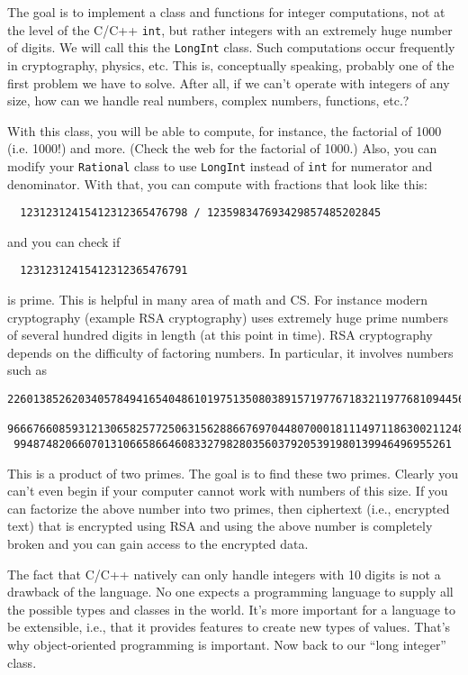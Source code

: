 The goal is to implement a class and functions for integer computations, not at
the level of the C/C++ \verb!int!, but rather integers with an extremely huge
number of digits. We will call this the \verb!LongInt! class.  Such
computations occur frequently in cryptography, physics, etc. This is,
conceptually speaking, probably one of the first problem we have to solve.
After all, if we can't operate with integers of any size, how can we handle
real numbers, complex numbers, functions, etc.?

With this class, you will be able to compute, for instance, the factorial of
1000 (i.e. 1000!) and more.  (Check the web for the factorial of 1000.) Also,
you can modify your \verb!Rational! class to use \verb!LongInt! instead of
\verb!int!  for numerator and denominator. With that, you can compute with
fractions that look like this:

\verb!  12312312415412312365476798 / 123598347693429857485202845!

and you can check if

\verb!  12312312415412312365476791!

is prime.  This is helpful in many area of math and CS. For instance modern
cryptography (example RSA cryptography) uses extremely huge prime numbers of
several hundred digits in length (at this point in time). RSA cryptography
depends on the difficulty of factoring numbers. In particular, it involves
numbers such as

\begin{Verbatim}
2260138526203405784941654048610197513508038915719776718321197768109445641817
 9666766085931213065825772506315628866769704480700018111497118630021124879281
 99487482066070131066586646083327982803560379205391980139946496955261
\end{Verbatim}

This is a product of two primes. The goal is to find these two primes. Clearly
you can't even begin if your computer cannot work with numbers of this size. If
you can factorize the above number into two primes, then ciphertext (i.e.,
encrypted text) that is encrypted using RSA and using the above number is
completely broken and you can gain access to the encrypted data.

The fact that C/C++ natively can only handle integers with 10 digits is not a
drawback of the language. No one expects a programming language to supply all
the possible types and classes in the world. It's more important for a language
to be extensible, i.e., that it provides features to create new types of
values.  That's why object-oriented programming is important.  Now back to our
“long integer” class.

